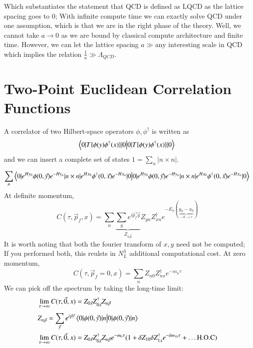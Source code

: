 Which substantiates the statement that QCD is defined as LQCD as the lattice spacing goes to 0; With infinite compute time we can exactly solve QCD under one assumption, which is that we are in the right phase of the theory. Well, we cannot take $a\rightarrow 0$ as we are bound by classical compute architecture and finite time. However, we can let the lattice spacing $a \gg \text{any interesting scale in QCD}$ which implies the relation $\frac{1}{a} \gg \Lambda_{QCD}$. 

\section{Two-Point Euclidean Correlation Functions}
A correlator of two Hilbert-space operators $\phi,\phi^\dagger$ is written as 
\begin{equation}
    \braket{0|T\{\phi(y)\phi^{\dagger}(x)\}|0} \\
\end{equation}and we can insert a complete set of states $1 = \sum_{n}^{} |n\times n|$.
\begin{equation}
    \sum_{n}^{} \braket{0|e^{Hy_0}\phi(0,\vec{y})e^{-Hy_n} | n \times n | e^{Hx_0}\phi^{\dagger}(0,\vec{x})e^{-Hx_n}|0} \\
\end{equation} At definite momentum,
\begin{equation}
    C(\tau,\vec{p}_f,x) = \sum_{n}^{} \underbrace{\sum_{y}^{} e^{i\vec{p_f}\vec{y}}}_{Z_{n\vec{p}}} Z_{yn}Z_{xn}^\dagger e^{-E_n(\underbrace{y_0-x_0}_{-it \to \tau})}    
\end{equation}
It is worth noting that both the fourier transform of $x,y$ need not be computed; If you performed both, this reulsts in $N_L^3$ additional computational cost. 
At zero momentum, 
\begin{equation}
    C(\tau,\vec{p}_f=0,x) = \sum_{n}^{} Z_{n0}Z_{nx}^\dagger e^{-m_n\tau} 
\end{equation} 
We can pick off the spectrum by taking the long-time limit: 
\begin{align}
    & \lim_{\tau \to \infty}C(\tau,\vec{0},x) = Z_{0\vec{x}}Z_{0\vec{x}}^\dagger Z_{n\vec{p}}  \\
    & Z_{n\vec{p}} = \sum_{\vec{y}}^{} e^{i\vec{p}\vec{y}}\braket{0|\phi(0,\vec{y})|n} \\ 
    & \lim_{\tau \to \infty}C(\tau,\vec{0},x) = Z_{0\vec{x}}Z_{0\vec{x}}^\dagger Z_{n\vec{p}}e^{-m_0\tau}(1+ \delta Z_{10}\delta Z_{1x}^\dagger e^{-\delta m_{10}\tau} + \dots \text{H.O.C})  \\
\end{align}
